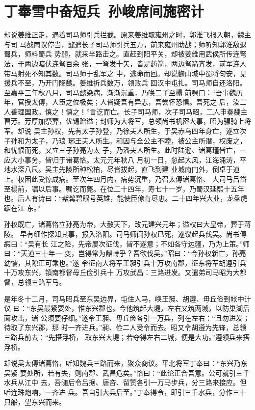 \chapter{丁奉雪中奋短兵~孙峻席间施密计}

却说姜维正走，遇着司马师引兵拦截。原来姜维取雍州之时，郭淮飞报入朝，魏主与司
马懿商议停当，懿遣长子司马师引兵五万，前来雍州助战；师听知郭淮敌退蜀兵，师料蜀兵
势弱，就来半路击之。直赶到阳平关，却被姜维用武侯所传连弩法，于两边暗伏连弩百余
张，一弩发十矢，皆是药箭，两边弩箭齐发，前军连人带马射死不知其数。司马师于乱军之
中，逃命而回。却说麴山城中蜀将句安，见援兵不至，乃开门降魏。姜维折兵数万，领败兵
回汉中屯扎。司马师自还洛阳。至嘉平三年秋八月，司马懿染病，渐渐沉重，乃唤二子至榻
前嘱曰：“吾事魏历年，官授太傅，人臣之位极矣；人皆疑吾有异志，吾尝怀恐惧。吾死之
后，汝二人善理国政。慎之！慎之！”言讫而亡。长子司马师，次子司马昭，二人申奏魏主
曹芳。芳厚加祭葬，优锡赠谥；封师为大将军，总领尚书机密大事，昭为骠骑上将军。却说
吴主孙权，先有太子孙登，乃徐夫人所生，于吴赤乌四年身亡，遂立次子孙和为太子，乃琅
琊王夫人所生。和因与全公主不睦，被公主所谮，权废之，和忧恨而死，又立三子孙亮为太
子，乃潘夫人所生。此时陆逊、诸葛瑾皆亡，一应大小事务，皆归于诸葛恪。太元元年秋八
月初一日，忽起大风，江海涌涛，平地水深八尺。吴主先陵所种松柏，尽皆拔起，直飞到建
业城南门外，倒卓于道上。权因此受惊成病。至次年四月内，病势沉重，乃召太傅诸葛恪、
大司马吕岱至榻前，嘱以后事。嘱讫而薨。在位二十四年，寿七十一岁，乃蜀汉延熙十五年
也。后人有诗曰：“紫髯碧眼号英雄，能使臣僚肯尽忠。二十四年兴大业，龙盘虎踞在江
东。”

孙权既亡，诸葛恪立孙亮为帝，大赦天下，改元建兴元年；谥权曰大皇帝，葬于蒋陵。
早有细作探知其事，报入洛阳。司马师闻孙权已死，遂议起兵伐吴。尚书傅嘏曰：“吴有长
江之险，先帝屡次征伐，皆不遂意；不如各守边疆，乃为上策。”师曰：“天道三十年一
变，岂得常为鼎峙乎？吾欲伐吴。”昭曰：“今孙权新亡，孙亮幼懦，其隙正可乘也。”遂
令征南大将军王昶引兵十万攻南郡，征东将军胡遵引兵十万攻东兴，镇南都督毋丘俭引兵十
万攻武昌：三路进发。又遣弟司马昭为大都督，总领三路军马。

是年冬十二月，司马昭兵至东吴边界，屯住人马，唤王昶、胡遵、毋丘俭到帐中计议
曰：“东吴最紧要处，惟东兴郡也。今他筑起大堤，左右又筑两城，以防巢湖后面攻击，诸
公须要仔细。”遂令王昶、毋丘俭各引一万兵，列在左右：“且勿进发；待取了东兴郡，那
时一齐进兵。”昶、俭二人受令而去。昭又令胡遵为先锋，总领三路兵前去：“先搭浮桥，
取东兴大堤；若夺得左右二城，便是大功。”遵领兵来搭浮桥。

却说吴太傅诸葛恪，听知魏兵三路而来，聚众商议。平北将军丁奉曰：“东兴乃东吴紧
要处所，若有失，则南郡、武昌危矣。”恪曰：“此论正合吾意。公可就引三千水兵从江中
去，吾随后令吕据、唐咨、留赞各引一万马步兵，分三路来接应。但听连珠炮响，一齐进
兵。吾自引大兵后至。”丁奉得令，即引三千水兵，分作三十只船，望东兴而来。

